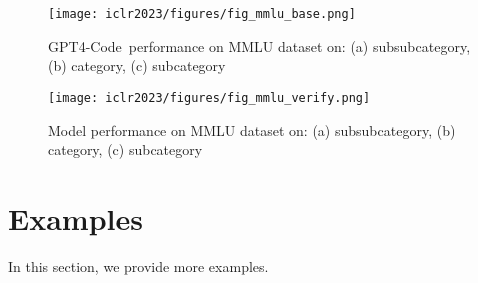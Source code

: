 \documentclass{article} \usepackage{iclr2023_conference,times}
\newcommand{\gptcode}{GPT4-Code}
\begin{document}
\begin{figure}[t]
    \centering
    \texttt{[image: iclr2023/figures/fig\_mmlu\_base.png]}
    \caption{\gptcode~performance on MMLU dataset on: (a) subsubcategory, (b) category, (c) subcategory}
\label{fig:mmlu}
\end{figure}

\begin{figure}[t]
    \centering
    \texttt{[image: iclr2023/figures/fig\_mmlu\_verify.png]}
    \caption{Model performance on MMLU dataset on: (a) subsubcategory, (b) category, (c) subcategory}
\label{fig:mmlu}
\end{figure}



\section{Examples}

In this section, we provide more examples.
\end{document}
